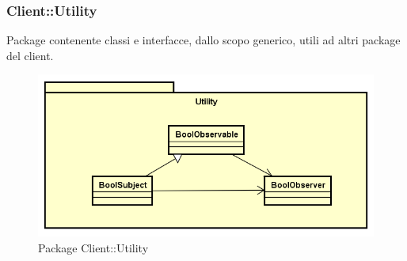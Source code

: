 \newpage
\subsubsection{Client::Utility}
Package contenente classi e interfacce, dallo scopo generico, utili ad altri package del client.
\begin{figure}[h] \centering \includegraphics[width=\textwidth,height=\textheight,keepaspectratio]{images/diagrams/client/Client/Utility.png}
	\caption{Package Client::Utility}
\end{figure}
\newpage

